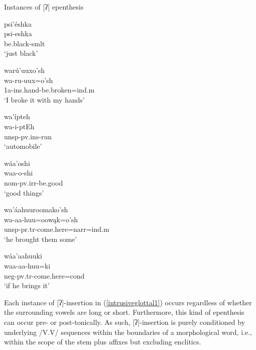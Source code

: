 \begin{exe}
\item\label{intrusiveglottal1} Instances of [ʔ] epenthesis

\begin{xlist}

\item\label{glottalep1}
\glll	psi'éshka\\
	psi-eshka\\
	\textnormal{be.black}-smlt\\
\glt	`just black' \citep[74]{hollow1973a}

\item\label{glottalep2}
\glll	warú'uuxo'sh\\
	wa-ru-uux=o'sh\\
	1a-ins.hand-\textnormal{be.broken}=ind.m\\
\glt `I broke it with my hands' \citep[47]{hollow1970}


\item\label{glottalep3}
\glll	wa'ípteh\\
	wa-i-ptEh\\
	unsp-pv.ins-\textnormal{run}\\
\glt	`automobile' \citep[338]{hollow1970}

\item\label{glottalep4}
\glll	wáa'oshi\\
	waa-o-shi\\
	nom-pv.irr-\textnormal{be.good}\\
\glt	`good things' \citet[132]{hollow1973a}

\item\label{glottalep5}
\glll	wa'áahuuroomako'sh\\
	wa-aa-huu=oowąk=o'sh\\
	unsp-pr.tr-\textnormal{come.here}=narr=ind.m\\
\glt	`he brought them some' \citep[177]{hollow1973a}

\item\label{glottalep6}
\glll	wáa'aahuuki\\
	waa-aa-huu=ki\\
	neg-pv.tr-\textnormal{come.here}=cond\\
\glt	`if he brings it' \citep[120]{hollow1973a}

\end{xlist}
\end{exe}

Each instance of [ʔ]-insertion in (\ref{intrusiveglottal1}) occurs regardless of whether the surrounding vowels are long or short. Furthermore, this kind of epenthesis can occur pre- or post-tonically. As such, [ʔ]-insertion is purely conditioned by underlying /V.V/ sequences within the boundaries of a morphological word, i.e., within the scope of the stem plus affixes but excluding enclitics.

